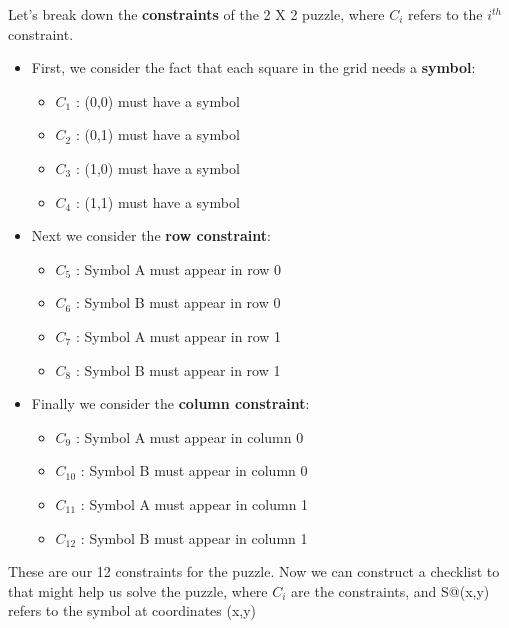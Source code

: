 \documentclass{article}
\begin{document}
Let's break down the \textbf{constraints} of the 2 X 2 puzzle, where $C_i$ refers to the $i^{th}$ constraint.
\begin{itemize}

\item First, we consider the fact that each square in the grid needs a \textbf{symbol}:
\begin{itemize}
    \item $C_1$ :  (0,0) must have a symbol
    \item $C_2$ :  (0,1) must have a symbol
    \item $C_3$ :  (1,0) must have a symbol
    \item $C_4$ :  (1,1) must have a symbol
\end{itemize}
\item Next we consider the \textbf{row constraint}:
\begin{itemize}
    \item $C_5$ :  Symbol A must appear in row 0
    \item $C_6$ :  Symbol B must appear in row 0
    \item $C_7$ :  Symbol A must appear in row 1
    \item $C_8$ :  Symbol B must appear in row 1
\end{itemize}
\item Finally we consider the \textbf{column constraint}:
\begin{itemize}
    \item $C_9$ :  Symbol A must appear in column 0
    \item $C_{10}$ :  Symbol B must appear in column 0
    \item $C_{11}$ :  Symbol A must appear in column 1
    \item $C_{12}$ :  Symbol B must appear in column 1
\end{itemize}
\end{itemize}
These are our 12 constraints for the puzzle. Now we can construct a checklist to that might help us solve the puzzle, where $C_i$ are the constraints, and S@(x,y) refers to the symbol at coordinates (x,y)
\end{document}
